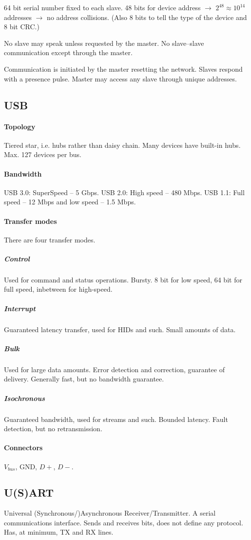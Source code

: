 \documentclass[a4paper, 12pt]{article}
\begin{document}
64 bit serial number fixed to each slave. 48 bits for device address $\rightarrow$ $2^{48} \approx 10^{14}$ addresses $\rightarrow$ no address collisions. (Also 8 bits to tell the type of the device and 8 bit CRC.)

No slave may speak unless requested by the master. No slave--slave communication except through the master.

Communication is initiated by the master resetting the network. Slaves respond with a presence pulse. Master may access any slave through unique addresses.

\subsection{USB}
\paragraph{Topology} Tiered star, i.e. hubs rather than daisy chain. Many devices have built-in hubs. Max. 127 devices per bus.
\paragraph{Bandwidth} USB 3.0: SuperSpeed -- 5 Gbps. USB 2.0: High speed -- 480 Mbps. USB 1.1: Full speed -- 12 Mbps and low speed -- 1.5 Mbps.
\paragraph{Transfer modes} There are four transfer modes.
\subparagraph{Control} Used for command and status operations. Bursty. 8 bit for low speed, 64 bit for full speed, inbetween for high-speed.
\subparagraph{Interrupt} Guaranteed latency transfer, used for HIDs and such. Small amounts of data.
\subparagraph{Bulk} Used for large data amounts. Error detection and correction, guarantee of delivery. Generally fast, but no bandwidth guarantee.
\subparagraph{Isochronous} Guaranteed bandwidth, used for streams and such. Bounded latency. Fault detection, but no retransmission.
\paragraph{Connectors} $V_{bus}$, GND, $D+$, $D-$.

\subsection{U(S)ART}
Universal (Synchronous/)Asynchronous Receiver/Transmitter. A serial communications interface. Sends and receives bits, does not define any protocol. Has, at minimum, TX and RX lines.
\end{document}
